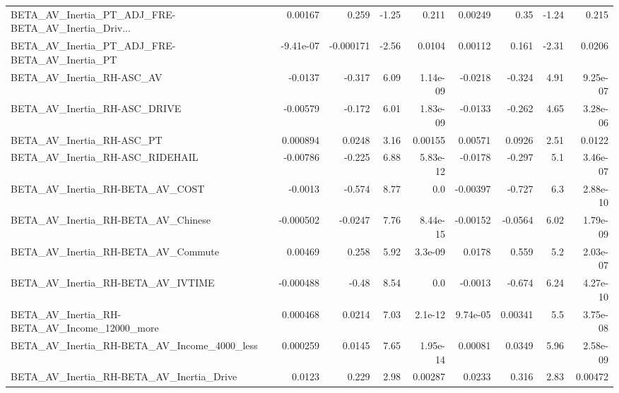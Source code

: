 \begin{tabular}{lrrrrrrrr}
BETA\_AV\_Inertia\_PT\_ADJ\_FRE-BETA\_AV\_Inertia\_Driv... &     0.00167 &        0.259 &    -1.25 &    0.211 &    0.00249 &        0.35 &        -1.24 &         0.215 \\
BETA\_AV\_Inertia\_PT\_ADJ\_FRE-BETA\_AV\_Inertia\_PT      &   -9.41e-07 &    -0.000171 &    -2.56 &   0.0104 &    0.00112 &       0.161 &        -2.31 &        0.0206 \\
BETA\_AV\_Inertia\_RH-ASC\_AV                          &     -0.0137 &       -0.317 &     6.09 & 1.14e-09 &    -0.0218 &      -0.324 &         4.91 &      9.25e-07 \\
BETA\_AV\_Inertia\_RH-ASC\_DRIVE                       &    -0.00579 &       -0.172 &     6.01 & 1.83e-09 &    -0.0133 &      -0.262 &         4.65 &      3.28e-06 \\
BETA\_AV\_Inertia\_RH-ASC\_PT                          &    0.000894 &       0.0248 &     3.16 &  0.00155 &    0.00571 &      0.0926 &         2.51 &        0.0122 \\
BETA\_AV\_Inertia\_RH-ASC\_RIDEHAIL                    &    -0.00786 &       -0.225 &     6.88 & 5.83e-12 &    -0.0178 &      -0.297 &          5.1 &      3.46e-07 \\
BETA\_AV\_Inertia\_RH-BETA\_AV\_COST                    &     -0.0013 &       -0.574 &     8.77 &      0.0 &   -0.00397 &      -0.727 &          6.3 &      2.88e-10 \\
BETA\_AV\_Inertia\_RH-BETA\_AV\_Chinese                 &   -0.000502 &      -0.0247 &     7.76 & 8.44e-15 &   -0.00152 &     -0.0564 &         6.02 &      1.79e-09 \\
BETA\_AV\_Inertia\_RH-BETA\_AV\_Commute                 &     0.00469 &        0.258 &     5.92 &  3.3e-09 &     0.0178 &       0.559 &          5.2 &      2.03e-07 \\
BETA\_AV\_Inertia\_RH-BETA\_AV\_IVTIME                  &   -0.000488 &        -0.48 &     8.54 &      0.0 &    -0.0013 &      -0.674 &         6.24 &      4.27e-10 \\
BETA\_AV\_Inertia\_RH-BETA\_AV\_Income\_12000\_more       &    0.000468 &       0.0214 &     7.03 &  2.1e-12 &   9.74e-05 &     0.00341 &          5.5 &      3.75e-08 \\
BETA\_AV\_Inertia\_RH-BETA\_AV\_Income\_4000\_less        &    0.000259 &       0.0145 &     7.65 & 1.95e-14 &    0.00081 &      0.0349 &         5.96 &      2.58e-09 \\
BETA\_AV\_Inertia\_RH-BETA\_AV\_Inertia\_Drive           &      0.0123 &        0.229 &     2.98 &  0.00287 &     0.0233 &       0.316 &         2.83 &       0.00472 \\

\end{tabular}
